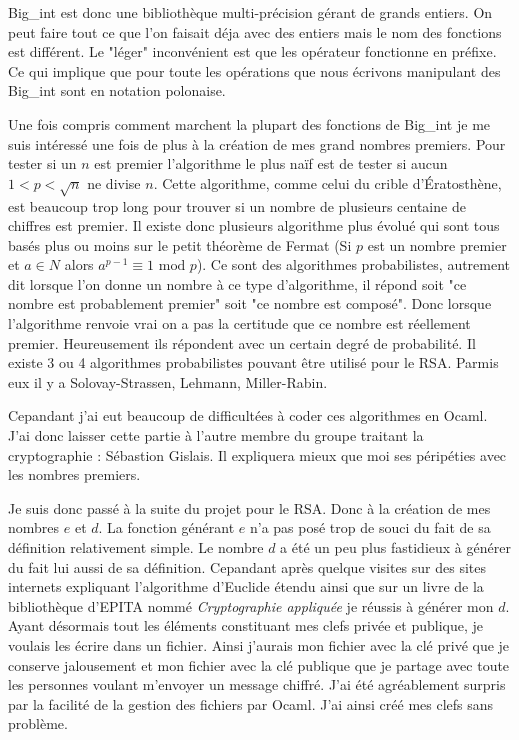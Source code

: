 \documentclass[a4paper,12pt]{article}
\begin{document}
		Big\_int est donc une bibliothèque multi-précision gérant de grands entiers. On peut faire tout ce que l'on faisait déja avec 
		des entiers mais le nom des fonctions est différent. Le "léger" inconvénient est que les opérateur fonctionne en préfixe. Ce 
		qui implique que pour toute les opérations que nous écrivons manipulant des Big\_int sont en notation polonaise. 
		
		Une fois compris comment marchent la plupart des fonctions de Big\_int je me suis intéressé une fois de plus à la création de 
		mes grand nombres premiers.	Pour tester si un $n$ est premier l'algorithme le plus naïf est de tester si aucun $1 < p < 
		\sqrt{n} $ ne divise $n$. Cette algorithme, comme celui  du crible d'Ératosthène, est beaucoup trop long pour trouver si un 
		nombre de plusieurs centaine de chiffres est premier. Il existe donc plusieurs algorithme plus évolué qui sont tous basés 
		plus ou moins sur le petit théorème de Fermat (Si $p$ est un nombre premier et $a \in N $ alors $a^{p - 1} \equiv 
		 1 \textrm{ mod } p$). Ce sont des algorithmes probabilistes, autrement dit lorsque l'on donne un nombre à ce type 
		 d'algorithme, il répond soit "ce nombre est probablement premier" soit "ce nombre est composé". Donc lorsque l'algorithme 
		 renvoie vrai on a pas la certitude que ce nombre est réellement premier. Heureusement ils répondent avec un certain degré de 
		 probabilité. Il existe 3 ou 4 algorithmes probabilistes pouvant être utilisé pour le RSA. Parmis eux il y a Solovay-Strassen, 
		 Lehmann, Miller-Rabin.
		 
		 Cepandant j'ai eut beaucoup de difficultées à coder ces algorithmes en Ocaml. J'ai donc laisser cette partie à l'autre membre 
		 du groupe traitant la cryptographie : Sébastion Gislais. Il expliquera mieux que moi ses péripéties avec les nombres 	
		 premiers.
		 
		 Je suis donc passé à la suite du projet pour le RSA. Donc à la création de mes nombres $e$ et $d$. La fonction générant $e$
		 n'a pas posé trop de souci du fait de sa définition relativement simple. Le nombre $d$ a été un peu plus fastidieux à
		 générer du fait lui aussi de sa définition. Cepandant après quelque visites sur des sites internets expliquant l'algorithme
		 d'Euclide étendu ainsi que sur un livre de la bibliothèque d'EPITA nommé \textit{Cryptographie appliquée} je réussis à 
		 générer mon $d$. Ayant désormais tout les éléments constituant mes clefs privée et publique, je voulais les écrire dans
		 un fichier. Ainsi j'aurais mon fichier avec la clé privé que je conserve jalousement et mon fichier avec la clé publique
		 que je partage avec toute les personnes voulant m'envoyer un message chiffré. J'ai été agréablement surpris par la facilité 
		 de la gestion des fichiers par Ocaml. J'ai ainsi créé mes clefs sans problème. 
		 
\end{document}
